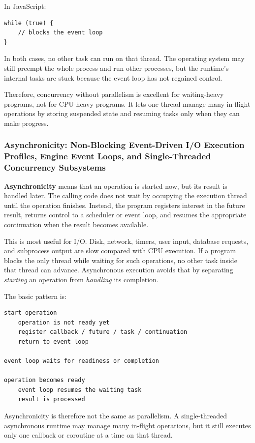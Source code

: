 In JavaScript:

\begin{verbatim}
while (true) {
    // blocks the event loop
}
\end{verbatim}

In both cases, no other task can run on that thread. The operating system may still preempt the whole process and run other processes, but the runtime's internal tasks are stuck because the event loop has not regained control.

Therefore, concurrency without parallelism is excellent for waiting-heavy programs, not for CPU-heavy programs. It lets one thread manage many in-flight operations by storing suspended state and resuming tasks only when they can make progress.


\subsubsection{Asynchronicity: Non-Blocking Event-Driven I/O Execution Profiles, Engine Event Loops, and Single-Threaded Concurrency Subsystems}

\textbf{Asynchronicity} means that an operation is started now, but its result is handled later. The calling code does not wait by occupying the execution thread until the operation finishes. Instead, the program registers interest in the future result, returns control to a scheduler or event loop, and resumes the appropriate continuation when the result becomes available.

This is most useful for I/O. Disk, network, timers, user input, database requests, and subprocess output are slow compared with CPU execution. If a program blocks the only thread while waiting for such operations, no other task inside that thread can advance. Asynchronous execution avoids that by separating \emph{starting} an operation from \emph{handling} its completion.

The basic pattern is:

\begin{verbatim}
start operation
    operation is not ready yet
    register callback / future / task / continuation
    return to event loop

event loop waits for readiness or completion

operation becomes ready
    event loop resumes the waiting task
    result is processed
\end{verbatim}

Asynchronicity is therefore not the same as parallelism. A single-threaded asynchronous runtime may manage many in-flight operations, but it still executes only one callback or coroutine at a time on that thread.

